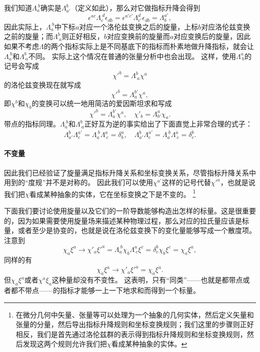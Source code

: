 我们知道$\Lambda_a^{\ b}$确实是$\Lambda_{a'}^{b}$（定义如此），那么对它做指标升降会得到
\[
    \epsilon^{ac} \Lambda_c^{\ d} \epsilon_{db} = \epsilon^{a' c'} \Lambda_{c'}^{d} \epsilon_{db} = \Lambda^{a'}_b,
\]
因此实际上，$\Lambda_a^{\ b}$中下标$a$对应一个洛伦兹变换之后的旋量，上标$b$对应洛伦兹变换之前的旋量；而$\Lambda_{\ a}^b$则正好相反，$b$对应变换前的旋量而$a$对应变换后的旋量，因此如果不考虑$\Lambda$的两个指标实际上是不同基底下的指标而朴素地做升降指标，就会让$\Lambda_a^{\ b}$和$\Lambda^b_{\ a}$不同。
实际上这个情况在普通的张量分析中也会出现。
这样，使用$\Lambda^a_{\ b}$的记号会写成
\[
    \chi'^b = \Lambda^b_{\ a} \chi^a
\]
的洛伦兹变换现在就写成
\[
    \chi'^b = \Lambda_a^{b'} \chi^a,
\]
即$\chi^b$和$\chi_b$的变换可以统一地用简洁的爱因斯坦求和写成
\[
    \chi'^b = \Lambda_a^{b'} \chi^a, \quad \chi'_b = \Lambda_{b'}^a \chi_a.
\]
带点的指标同理。$\Lambda_a^{\ b}$和$\Lambda^b_{\ a}$正好互为逆的事实给出了下面直觉上非常合理的式子：
\begin{equation}
    \Lambda_{a'}^b \Lambda^{a'}_c = \Lambda_a^{\ b} \Lambda^a_{\ c} = \delta_b^a, \quad \Lambda_{\dot{a}'}^{\dot{b}} \Lambda^{\dot{a}'}_{\dot{c}} = \Lambda_{\dot{a}}^{\ \dot{b}} \Lambda^{\dot{a}}_{\ \dot{c}} = \delta_{\dot{c}}^{\dot{b}}.
\end{equation}

\paragraph{不变量} 因此我们已经验证了旋量满足指标升降关系和坐标变换关系，尽管指标升降关系中用到的“度规”并不是对称的。
因此我们可以使用$\chi^{a'}$这样的记号代替${\chi'}^{a}$，也就是说我们把$\chi$看成某种抽象的实体，它在坐标变换之下是不变的。%
\footnote{在微分几何中矢量、张量等可以处理为一个抽象的几何实体，然后定义矢量和张量的分量，然后导出指标升降规则和坐标变换规则；我们这里的步骤则正好相反，我们是首先通过洛伦兹群的表示得到指标升降规则和坐标变换规则，然后发现这两个规则允许我们把$\chi$看成某种抽象的实体。}%

下面我们要讨论使用旋量以及它们的一阶导数能够构造出怎样的标量。这是很重要的，因为如果需要使用旋量场来描述某种物理过程，那么对应的拉氏量应该是标量，或者至少是协变的，也就是说在洛伦兹变换下的变化量能够写成一个散度项。
注意到
\[
    \chi_a \xi^a \longrightarrow \chi'_a {\xi'}^a = \Lambda_a^{\ b} \chi_b \Lambda^a_{\ c} \xi^c = \delta_c^b \chi_b \xi^c = \chi_a \xi^a,
\]
同样的有
\[
    \chi_{\dot{a}} \xi^{\dot{a}} \longrightarrow \chi'_{\dot{a}} {\xi'}^{\dot{a}} = \chi_{\dot{a}} \xi^{\dot{a}}.
\]
但$\chi_a \xi^{\dot{a}}$或者$\chi^{\dot{a}} \xi_a$这种量却没有不变性。
这表明，只有“同类”——也就是都带点或者都不带点——的指标才能够一上一下地求和而得到一个标量。

